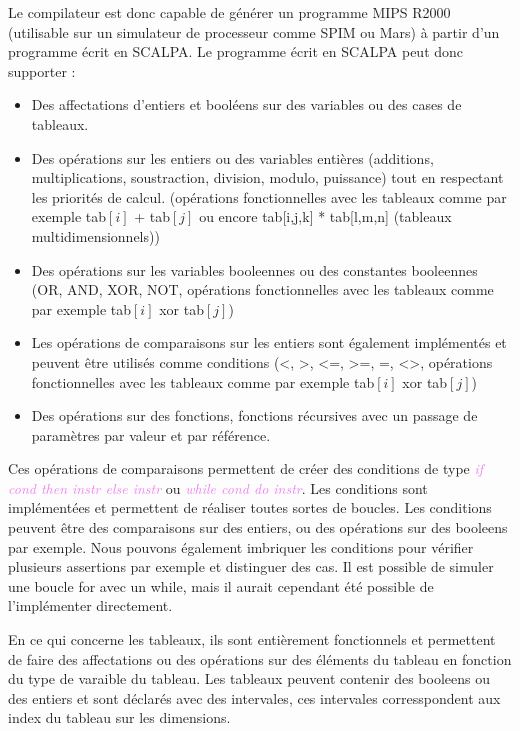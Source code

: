 \documentclass[a4paper]{article}
\let\oldtextit\textit
\renewcommand{\textit}[1]{\textcolor{violet}{\oldtextit{#1}}}
\begin{document}
Le compilateur est donc capable de générer un programme MIPS R2000 (utilisable sur un simulateur de processeur comme SPIM ou Mars) à partir d'un programme écrit en SCALPA.
Le programme écrit en SCALPA peut donc supporter :
\begin{itemize}
    \item Des affectations d'entiers et booléens sur des variables ou des cases de tableaux.
    \item Des opérations sur les entiers ou des variables entières (additions, multiplications, soustraction, division, modulo, puissance) tout en respectant les priorités de calcul. (opérations fonctionnelles avec les tableaux comme par exemple tab$[i]$ + tab$[j]$ ou encore tab[i,j,k] * tab[l,m,n] (tableaux multidimensionnels))
    \item Des opérations sur les variables booleennes ou des constantes booleennes (OR, AND, XOR, NOT, opérations fonctionnelles avec les tableaux comme par exemple tab$[i]$ xor tab$[j]$)
    \item Les opérations de comparaisons sur les entiers sont également implémentés et peuvent être utilisés comme conditions (<, >, <=, >=, =, <>, opérations fonctionnelles avec les tableaux comme par exemple tab$[i]$ xor tab$[j]$)
    \item Des opérations sur des fonctions, fonctions récursives avec un passage de paramètres par valeur et par référence.

\end{itemize}

Ces opérations de comparaisons permettent de créer des conditions de type \textit{if cond then instr else instr } ou \textit{while cond do instr}. Les conditions sont implémentées et permettent de réaliser toutes sortes de boucles. Les conditions peuvent être des comparaisons sur des entiers, ou des opérations sur des booleens par exemple.
Nous pouvons également imbriquer les conditions pour vérifier plusieurs assertions par exemple et distinguer des cas.
Il est possible de simuler une boucle for avec un while, mais il aurait cependant été possible de l'implémenter directement.

En ce qui concerne les tableaux, ils sont entièrement fonctionnels et permettent de faire des affectations ou des opérations sur des éléments du tableau en fonction du type de varaible du tableau. Les tableaux peuvent contenir des booleens ou des entiers et sont déclarés avec des intervales, ces intervales corresspondent aux index du tableau sur les dimensions.
\end{document}
